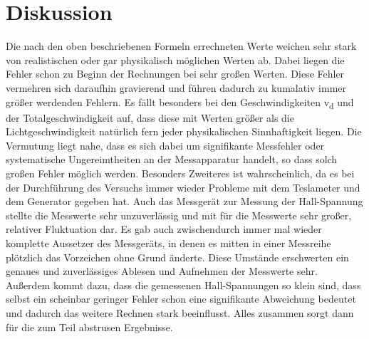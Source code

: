 \documentclass[titlepage=firstcover, captions=tableheading]{scrartcl}
\begin{document}
\section{Diskussion}
Die nach den oben beschriebenen Formeln errechneten Werte weichen sehr stark von realistischen oder gar physikalisch möglichen Werten ab. Dabei liegen die Fehler schon zu Beginn der Rechnungen bei sehr großen Werten. Diese Fehler vermehren sich daraufhin gravierend und führen dadurch zu kumalativ immer größer werdenden Fehlern. Es fällt besonders bei den Geschwindigkeiten v\textsubscript{d} und der Totalgeschwindigkeit auf, dass diese mit Werten größer als die Lichtgeschwindigkeit natürlich fern jeder physikalischen Sinnhaftigkeit liegen. Die Vermutung liegt nahe, dass es sich dabei um signifikante Messfehler oder systematische Ungereimtheiten an der Messapparatur handelt, so dass solch großen Fehler möglich werden. Besonders Zweiteres ist wahrscheinlich, da es bei der Durchführung des Versuchs immer wieder Probleme mit dem Teslameter und dem Generator gegeben hat. Auch das Messgerät zur Messung der Hall-Spannung stellte die Messwerte sehr unzuverlässig und mit für die Messwerte sehr großer, relativer Fluktuation dar. Es gab auch zwischendurch immer mal wieder komplette Aussetzer des Messgeräts, in denen es mitten in einer Messreihe plötzlich das Vorzeichen ohne Grund änderte. Diese Umstände erschwerten ein genaues und zuverlässiges Ablesen und Aufnehmen der Messwerte sehr. Außerdem kommt dazu, dass die gemessenen Hall-Spannungen so klein sind, dass selbst ein scheinbar geringer Fehler schon eine signifikante Abweichung bedeutet und dadurch das weitere Rechnen stark beeinflusst. Alles zusammen sorgt dann für die zum Teil abstrusen Ergebnisse.
\end{document}
